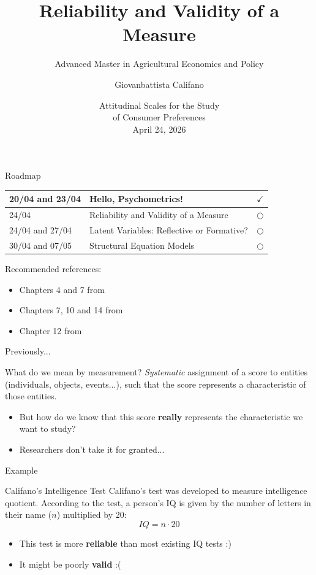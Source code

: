 \documentclass{beamer}
\title[Lecture 2]{Reliability and Validity of a Measure}
\subtitle{Advanced Master in Agricultural Economics and Policy}
\author{Giovanbattista Califano}
\date[Portici, 24/04/2025]{Attitudinal Scales for the Study \\ of Consumer Preferences \\ April 24, 2026}
\institute[UNINA]{University of Naples Federico II, giovanbattista.califano@unina.it}
\begin{document}
\frame{\titlepage}

\begin{frame}{Roadmap}
    \begin{center}
        \begin{tabular}{|l|l|c|}
        \hline
        20/04 and 23/04 &  Hello, Psychometrics! & $\checkmark$ \\
        \hline
        24/04 & Reliability and Validity of a Measure & $\bigcirc$ \\
        \hline
        24/04 and 27/04 & Latent Variables: Reflective or Formative? & $\bigcirc$ \\
        \hline
        30/04 and 07/05 & Structural Equation Models & $\bigcirc$ \\
        \hline
        \end{tabular}
    \end{center}
\vspace{0.1cm}
\footnotesize
Recommended references: \\
\begin{itemize}
    \item Chapters 4 and 7 from \cite{jhangiani2019research}
    \item Chapters 7, 10 and 14 from \cite{olivero2022psicologia}
    \item Chapter 12 from \cite{mehmetoglu2022applied}
\end{itemize}
\scriptsize


\end{frame}

\begin{frame}{Previously...}
\begin{block}{What do we mean by measurement?}
    \textit{Systematic} assignment of a score to entities (individuals, objects, events...), such that the score represents a characteristic of those entities.
\end{block}
\pause
\begin{itemize}
    \item But how do we know that this score \textbf{really} represents the characteristic we want to study?
    \item Researchers don't take it for granted...
\end{itemize}
\end{frame}

\begin{frame}{Example}
\begin{block}{Califano's Intelligence Test}
    Califano's test was developed to measure intelligence quotient. According to the test, a person's IQ is given by the number of letters in their name ($n$) multiplied by 20: \\
    \[
    IQ = n \cdot 20
    \]
\end{block}
\pause
\begin{itemize}
    \item This test is more \textbf{reliable} than most existing IQ tests :)
    \pause
    \item It might be poorly \textbf{valid} :(
\end{itemize}
\end{frame}
\end{document}
